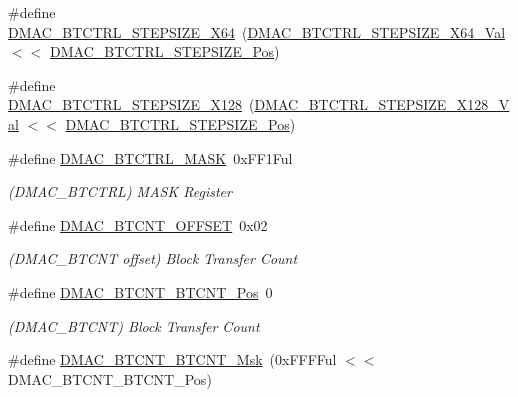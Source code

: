 \begin{DoxyCompactItemize}
\item 
\#define \mbox{\hyperlink{group___s_a_m_d21___d_m_a_c_ga47f51f2254b08988f3941766f9e5f95a}{D\+M\+A\+C\+\_\+\+B\+T\+C\+T\+R\+L\+\_\+\+S\+T\+E\+P\+S\+I\+Z\+E\+\_\+\+X64}}~(\mbox{\hyperlink{group___s_a_m_d21___d_m_a_c_ga4c940b8055fe3e170f6d069523d1dc5a}{D\+M\+A\+C\+\_\+\+B\+T\+C\+T\+R\+L\+\_\+\+S\+T\+E\+P\+S\+I\+Z\+E\+\_\+\+X64\+\_\+\+Val}}  $<$$<$ \mbox{\hyperlink{group___s_a_m_d21___d_m_a_c_gacf7558693207543fbd9048f7f76fa238}{D\+M\+A\+C\+\_\+\+B\+T\+C\+T\+R\+L\+\_\+\+S\+T\+E\+P\+S\+I\+Z\+E\+\_\+\+Pos}})
\item 
\#define \mbox{\hyperlink{group___s_a_m_d21___d_m_a_c_ga28aacefebb6ec92b8bf77f2059fe05a2}{D\+M\+A\+C\+\_\+\+B\+T\+C\+T\+R\+L\+\_\+\+S\+T\+E\+P\+S\+I\+Z\+E\+\_\+\+X128}}~(\mbox{\hyperlink{group___s_a_m_d21___d_m_a_c_gac60f6c18ae8ba088c4b1c09764074bb5}{D\+M\+A\+C\+\_\+\+B\+T\+C\+T\+R\+L\+\_\+\+S\+T\+E\+P\+S\+I\+Z\+E\+\_\+\+X128\+\_\+\+Val}} $<$$<$ \mbox{\hyperlink{group___s_a_m_d21___d_m_a_c_gacf7558693207543fbd9048f7f76fa238}{D\+M\+A\+C\+\_\+\+B\+T\+C\+T\+R\+L\+\_\+\+S\+T\+E\+P\+S\+I\+Z\+E\+\_\+\+Pos}})
\item 
\#define \mbox{\hyperlink{group___s_a_m_d21___d_m_a_c_ga0d1512d97a8147c95f766bd6b04070e1}{D\+M\+A\+C\+\_\+\+B\+T\+C\+T\+R\+L\+\_\+\+M\+A\+SK}}~0x\+F\+F1\+Ful
\begin{DoxyCompactList}\small\item\em (D\+M\+A\+C\+\_\+\+B\+T\+C\+T\+RL) M\+A\+SK Register \end{DoxyCompactList}\item 
\#define \mbox{\hyperlink{group___s_a_m_d21___d_m_a_c_gaf1d993ae92feed10a243994e9832ee27}{D\+M\+A\+C\+\_\+\+B\+T\+C\+N\+T\+\_\+\+O\+F\+F\+S\+ET}}~0x02
\begin{DoxyCompactList}\small\item\em (D\+M\+A\+C\+\_\+\+B\+T\+C\+NT offset) Block Transfer Count \end{DoxyCompactList}\item 
\#define \mbox{\hyperlink{group___s_a_m_d21___d_m_a_c_gafce48654ec425cf0d3c01e6b8d766945}{D\+M\+A\+C\+\_\+\+B\+T\+C\+N\+T\+\_\+\+B\+T\+C\+N\+T\+\_\+\+Pos}}~0
\begin{DoxyCompactList}\small\item\em (D\+M\+A\+C\+\_\+\+B\+T\+C\+NT) Block Transfer Count \end{DoxyCompactList}\item 
\#define \mbox{\hyperlink{group___s_a_m_d21___d_m_a_c_ga5782a95fe2f03ef099907901c9abf32b}{D\+M\+A\+C\+\_\+\+B\+T\+C\+N\+T\+\_\+\+B\+T\+C\+N\+T\+\_\+\+Msk}}~(0x\+F\+F\+F\+Ful $<$$<$ D\+M\+A\+C\+\_\+\+B\+T\+C\+N\+T\+\_\+\+B\+T\+C\+N\+T\+\_\+\+Pos)
$$
\end{DoxyCompactItemize}
